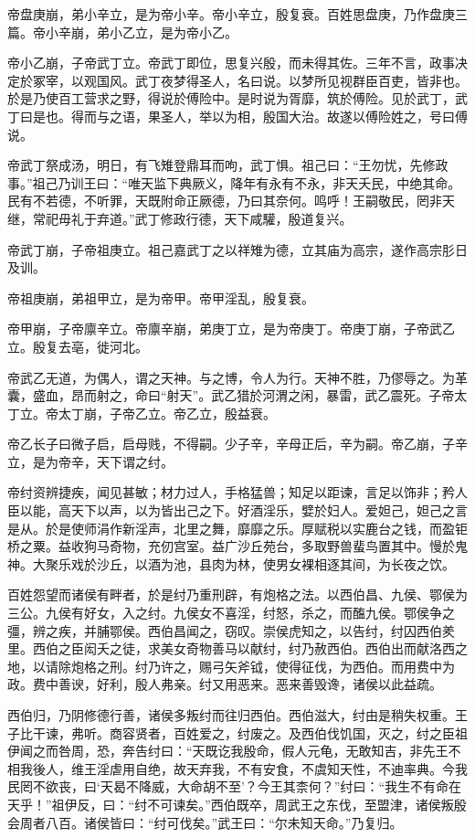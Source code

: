 \documentclass[UTF8,12pt,AutoFakeBold]{ctexart}
\begin{document}
帝盘庚崩，弟小辛立，是为帝小辛。帝小辛立，殷复衰。百姓思盘庚，乃作盘庚三篇。帝小辛崩，弟小乙立，是为帝小乙。

帝小乙崩，子帝武丁立。帝武丁即位，思复兴殷，而未得其佐。三年不言，政事决定於冢宰，以观国风。武丁夜梦得圣人，名曰说。以梦所见视群臣百吏，皆非也。於是乃使百工营求之野，得说於傅险中。是时说为胥靡，筑於傅险。见於武丁，武丁曰是也。得而与之语，果圣人，举以为相，殷国大治。故遂以傅险姓之，号曰傅说。
    
帝武丁祭成汤，明日，有飞雉登鼎耳而呴，武丁惧。祖己曰：“王勿忧，先修政事。”祖己乃训王曰：“唯天监下典厥义，降年有永有不永，非天夭民，中绝其命。民有不若德，不听罪，天既附命正厥德，乃曰其奈何。鸣呼！王嗣敬民，罔非天继，常祀毋礼于弃道。”武丁修政行德，天下咸驩，殷道复兴。

帝武丁崩，子帝祖庚立。祖己嘉武丁之以祥雉为德，立其庙为高宗，遂作高宗肜日及训。

帝祖庚崩，弟祖甲立，是为帝甲。帝甲淫乱，殷复衰。

帝甲崩，子帝廪辛立。帝廪辛崩，弟庚丁立，是为帝庚丁。帝庚丁崩，子帝武乙立。殷复去亳，徙河北。

帝武乙无道，为偶人，谓之天神。与之博，令人为行。天神不胜，乃僇辱之。为革囊，盛血，昂而射之，命曰“射天”。武乙猎於河渭之闲，暴雷，武乙震死。子帝太丁立。帝太丁崩，子帝乙立。帝乙立，殷益衰。

帝乙长子曰微子启，启母贱，不得嗣。少子辛，辛母正后，辛为嗣。帝乙崩，子辛立，是为帝辛，天下谓之纣。

帝纣资辨捷疾，闻见甚敏；材力过人，手格猛兽；知足以距谏，言足以饰非；矜人臣以能，高天下以声，以为皆出己之下。好酒淫乐，嬖於妇人。爱妲己，妲己之言是从。於是使师涓作新淫声，北里之舞，靡靡之乐。厚赋税以实鹿台之钱，而盈钜桥之粟。益收狗马奇物，充仞宫室。益广沙丘苑台，多取野兽蜚鸟置其中。慢於鬼神。大聚乐戏於沙丘，以酒为池，县肉为林，使男女裸相逐其间，为长夜之饮。

百姓怨望而诸侯有畔者，於是纣乃重刑辟，有炮格之法。以西伯昌、九侯、鄂侯为三公。九侯有好女，入之纣。九侯女不喜淫，纣怒，杀之，而醢九侯。鄂侯争之彊，辨之疾，并脯鄂侯。西伯昌闻之，窃叹。崇侯虎知之，以告纣，纣囚西伯羑里。西伯之臣闳夭之徒，求美女奇物善马以献纣，纣乃赦西伯。西伯出而献洛西之地，以请除炮格之刑。纣乃许之，赐弓矢斧钺，使得征伐，为西伯。而用费中为政。费中善谀，好利，殷人弗亲。纣又用恶来。恶来善毁谗，诸侯以此益疏。

西伯归，乃阴修德行善，诸侯多叛纣而往归西伯。西伯滋大，纣由是稍失权重。王子比干谏，弗听。商容贤者，百姓爱之，纣废之。及西伯伐饥国，灭之，纣之臣祖伊闻之而咎周，恐，奔告纣曰：“天既讫我殷命，假人元龟，无敢知吉，非先王不相我後人，维王淫虐用自绝，故天弃我，不有安食，不虞知天性，不迪率典。今我民罔不欲丧，曰‘天曷不降威，大命胡不至’？今王其柰何？”纣曰：“我生不有命在天乎！”祖伊反，曰：“纣不可谏矣。”西伯既卒，周武王之东伐，至盟津，诸侯叛殷会周者八百。诸侯皆曰：“纣可伐矣。”武王曰：“尔未知天命。”乃复归。
\end{document}
